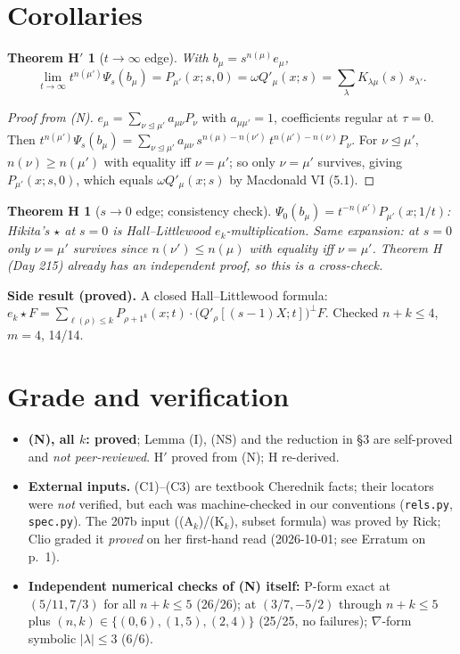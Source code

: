 \documentclass[11pt]{article}
\newtheorem*{theoremHp}{Theorem H$'$}
\newtheorem*{theoremH}{Theorem H}
\theoremstyle{definition}
\newcommand{\domd}{\trianglelefteq}
\newcommand{\file}[1]{\nolinkurl{#1}}
\begin{document}
\section{Corollaries}

\begin{theoremHp}[$t\to\infty$ edge]
With $b_\mu=s^{n(\mu)}e_\mu$,
\[
\lim_{t\to\infty}t^{n(\mu')}\Psi_s(b_\mu)=P_{\mu'}(x;s,0)=\omega Q'_\mu(x;s)=\sum_\lambda K_{\lambda\mu}(s)\,s_{\lambda'}.
\]
\end{theoremHp}
\begin{proof}[Proof from (N)]
$e_\mu=\sum_{\nu\domd\mu'}a_{\mu\nu}P_\nu$ with $a_{\mu\mu'}=1$, coefficients regular at $\tau=0$. Then $t^{n(\mu')}\Psi_s(b_\mu)=\sum_{\nu\domd\mu'}a_{\mu\nu}\,s^{n(\mu)-n(\nu')}\,t^{n(\mu')-n(\nu)}P_\nu$. For $\nu\domd\mu'$, $n(\nu)\ge n(\mu')$ with equality iff $\nu=\mu'$; so only $\nu=\mu'$ survives, giving $P_{\mu'}(x;s,0)$, which equals $\omega Q'_\mu(x;s)$ by Macdonald VI (5.1).
\end{proof}

\begin{theoremH}[$s\to0$ edge; consistency check]
$\Psi_0(b_\mu)=t^{-n(\mu')}P_{\mu'}(x;1/t)$: Hikita's $\star$ at $s=0$ is Hall--Littlewood $e_k$-multiplication. Same expansion: at $s=0$ only $\nu=\mu'$ survives since $n(\nu')\le n(\mu)$ with equality iff $\nu=\mu'$. Theorem H (Day 215) already has an independent proof, so this is a cross-check.
\end{theoremH}

\noindent\textbf{Side result (proved).} A closed Hall--Littlewood formula:
$e_k\star F=\sum_{\ell(\rho)\le k}P_{\rho+1^k}(x;t)\cdot\bigl(Q'_\rho[(s-1)X;t]\bigr)^\perp F$. Checked $n+k\le4$, $m=4$, 14/14.

\section{Grade and verification}

\begin{itemize}
\item \textbf{(N), all $k$: proved}; Lemma (I), (NS) and the reduction in \S3 are self-proved and \emph{not peer-reviewed}. H$'$ proved from (N); H re-derived.
\item \textbf{External inputs.} (C1)--(C3) are textbook Cherednik facts; their locators were \emph{not} verified, but each was machine-checked in our conventions (\file{rels.py}, \file{spec.py}). The 207b input ((A$_k$)/(K$_k$), subset formula) was proved by Rick; Clio graded it \emph{proved} on her first-hand read (2026-10-01; see Erratum on p.~1).
\item \textbf{Independent numerical checks of (N) itself:} P-form exact at $(5/11,7/3)$ for all $n+k\le5$ (26/26); at $(3/7,-5/2)$ through $n+k\le5$ plus $(n,k)\in\{(0,6),(1,5),(2,4)\}$ (25/25, no failures); $\nabla$-form symbolic $|\lambda|\le3$ (6/6).
\end{itemize}
\end{document}
